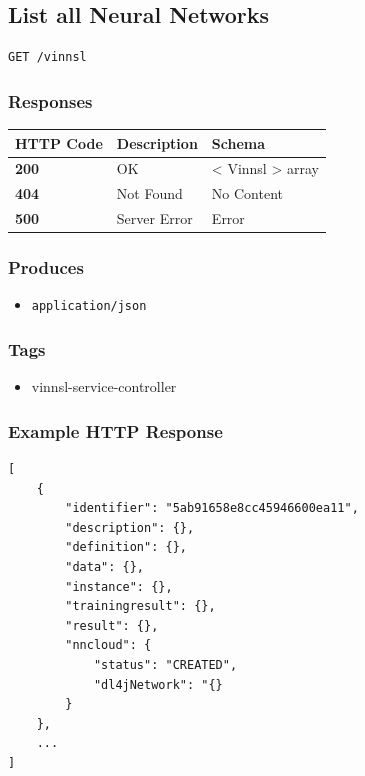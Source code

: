 \subsection{List all Neural Networks}\label{list-all-neural-networks}

\begin{verbatim}
GET /vinnsl
\end{verbatim}

\subsubsection{Responses}\label{responses-1}

\begin{longtable}[]{@{}lll@{}}
\toprule
HTTP Code & Description & Schema\tabularnewline
\midrule
\endhead
\textbf{200} & OK & \textless{} Vinnsl \textgreater{}
array\tabularnewline
\textbf{404} & Not Found & No Content\tabularnewline
\textbf{500} & Server Error & Error\tabularnewline
\bottomrule
\end{longtable}

\subsubsection{Produces}\label{produces-1}

\begin{itemize}
\tightlist
\item
  \texttt{application/json}
\end{itemize}

\subsubsection{Tags}\label{tags-1}

\begin{itemize}
\tightlist
\item
  vinnsl-service-controller
\end{itemize}

\subsubsection{Example HTTP Response}\label{example-http-response-1}

\begin{verbatim}
[
    {
        "identifier": "5ab91658e8cc45946600ea11",
        "description": {},
        "definition": {},
        "data": {},
        "instance": {},
        "trainingresult": {},
        "result": {},
        "nncloud": {
            "status": "CREATED",
            "dl4jNetwork": "{}
        }
    },
    ...
]
\end{verbatim}

